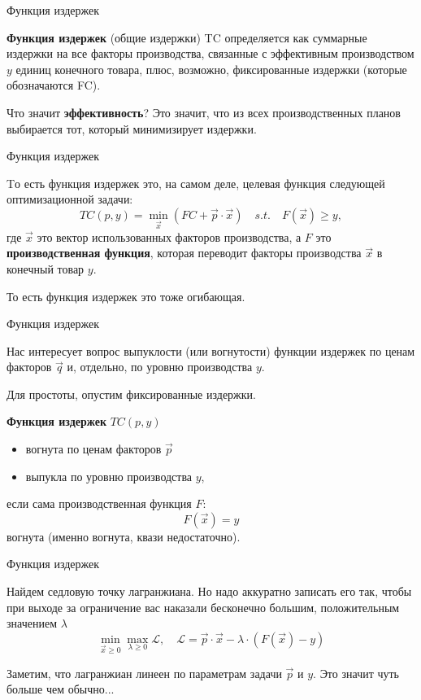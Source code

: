 \documentclass{beamer}
\begin{document}
\begin{frame}{Функция издержек}

\begin{definition}
\textbf{Функция издержек} (общие издержки) TC определяется как суммарные издержки на все факторы производства, связанные с эффективным производством $y$ единиц конечного товара, плюс, возможно, фиксированные издержки (которые обозначаются FC).
\end{definition}

Что значит \textbf{эффективность}? Это значит, что из всех производственных планов выбирается тот, который минимизирует издержки.
\end{frame}

\begin{frame}{Функция издержек}

Tо есть функция издержек это, на самом деле, целевая функция следующей оптимизационной задачи:
$$ TC(p, y) = \min_{\vec x} ( FC + \vec p \cdot \vec x ) \quad s.t. \quad F(\vec x) \geqslant y,$$
где $\vec x$ это вектор использованных факторов производства, а $F$ это \textbf{производственная функция}, которая переводит факторы производства $\vec x$ в конечный товар $y$.

То есть функция издержек это тоже огибающая.

\end{frame}

\begin{frame}{Функция издержек}

Нас интересует вопрос выпуклости (или вогнутости) функции издержек по ценам факторов $\vec q$ и, отдельно, по уровню производства $y$. 

Для простоты, опустим фиксированные издержки.

\begin{lemma}
\textbf{Функция издержек} $TC(p,y)$
\begin{itemize}
\item вогнута по ценам факторов $\vec p$
\item выпукла по уровню производства $y$,
\end{itemize}

если сама производственная функция $F$:
$$
F(\vec x) = y
$$
вогнута (именно вогнута, квази недостаточно).
\end{lemma}

\end{frame}

\begin{frame}{Функция издержек}

Найдем седловую точку лагранжиана. Но надо аккуратно записать его так, чтобы при выходе за ограничение вас наказали бесконечно большим, положительным значением $\lambda$
$$ \min_{\vec x \geqslant 0} \max_{\lambda \geqslant 0} \mathcal{L}, \quad \mathcal{L} = \vec p \cdot \vec x - \lambda \cdot (F(\vec x) - y)$$

Заметим, что лагранжиан линеен по параметрам задачи $\vec p$ и $y$. Это значит чуть больше чем обычно...

\end{frame}
\end{document}
